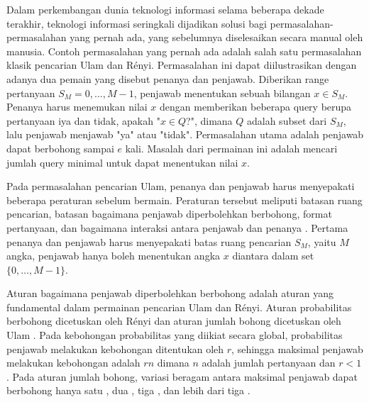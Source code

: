 \documentclass[conference,compsoc]{IEEEtran}
\begin{document}
Dalam perkembangan dunia teknologi informasi selama beberapa dekade terakhir, teknologi informasi seringkali dijadikan solusi bagi permasalahan-permasalahan yang pernah ada, yang sebelumnya diselesaikan secara manual oleh manusia. Contoh permasalahan yang pernah ada adalah salah satu permasalahan klasik pencarian Ulam dan Rényi. Permasalahan ini dapat diilustrasikan dengan adanya dua pemain yang disebut penanya dan penjawab. Diberikan range pertanyaan $S_M = {0,\ldots,M-1}$, penjawab menentukan sebuah bilangan $x \in S_M$. Penanya harus menemukan nilai $x$ dengan memberikan beberapa query berupa pertanyaan iya dan tidak, apakah "$x \in Q$?", dimana $Q$ adalah subset dari $S_M$, lalu penjawab menjawab "ya" atau "tidak". Permasalahan utama adalah penjawab dapat berbohong sampai $e$ kali. Masalah dari permainan ini adalah mencari jumlah query minimal untuk dapat menentukan nilai $x$.


Pada permasalahan pencarian Ulam, penanya dan penjawab harus menyepakati beberapa peraturan sebelum bermain. Peraturan tersebut meliputi batasan ruang pencarian, batasan bagaimana penjawab diperbolehkan berbohong, format pertanyaan, dan bagaimana interaksi antara penjawab dan penanya \cite{Pelc2002}. Pertama penanya dan penjawab harus menyepakati batas ruang pencarian $S_M$, yaitu $M$ angka, penjawab hanya boleh menentukan angka $x$ diantara dalam set $\{0,\ldots,M-1\}$.

Aturan bagaimana penjawab diperbolehkan berbohong adalah aturan yang fundamental dalam permainan pencarian Ulam dan Rényi. Aturan probabilitas berbohong dicetuskan oleh Rényi dan aturan jumlah bohong dicetuskan oleh Ulam \cite{Ulam1991}. Pada kebohongan probabilitas yang diikiat secara global, probabilitas penjawab melakukan kebohongan ditentukan oleh $r$, sehingga maksimal penjawab melakukan kebohongan adalah $rn$ dimana $n$ adalah jumlah pertanyaan dan $r<1$ \cite{Dhagat1992}. Pada aturan jumlah bohong, variasi beragam antara maksimal penjawab dapat berbohong hanya satu \cite{Ellis2008} \cite{Pelc1988}, dua \cite{Cicalese2000}, tiga \cite{Negro1992}, dan lebih dari tiga \cite{Berlekamp1998} \cite{Deppe2004}.
\end{document}
